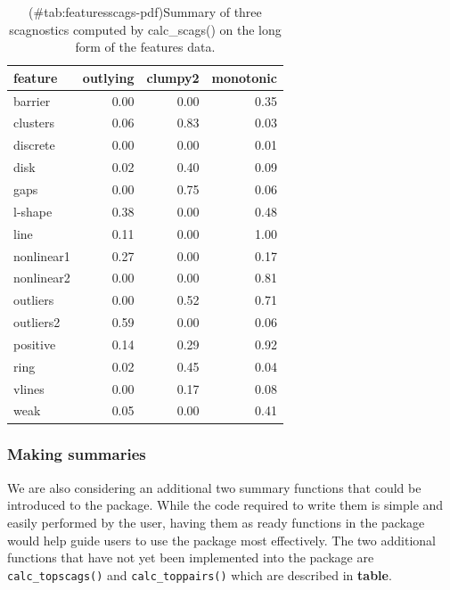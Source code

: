 \begin{Schunk}
\begin{table}

\caption{(\#tab:featuresscags-pdf)Summary of three scagnostics computed by calc\_scags() on the long form of the features data.}
\centering
\begin{tabular}[t]{>{\raggedright\arraybackslash}p{3cm}rrr}
\toprule
feature & outlying & clumpy2 & monotonic\\
\midrule
barrier & 0.00 & 0.00 & 0.35\\
clusters & 0.06 & 0.83 & 0.03\\
discrete & 0.00 & 0.00 & 0.01\\
disk & 0.02 & 0.40 & 0.09\\
gaps & 0.00 & 0.75 & 0.06\\
\addlinespace
l-shape & 0.38 & 0.00 & 0.48\\
line & 0.11 & 0.00 & 1.00\\
nonlinear1 & 0.27 & 0.00 & 0.17\\
nonlinear2 & 0.00 & 0.00 & 0.81\\
outliers & 0.00 & 0.52 & 0.71\\
\addlinespace
outliers2 & 0.59 & 0.00 & 0.06\\
positive & 0.14 & 0.29 & 0.92\\
ring & 0.02 & 0.45 & 0.04\\
vlines & 0.00 & 0.17 & 0.08\\
weak & 0.05 & 0.00 & 0.41\\
\bottomrule
\end{tabular}
\end{table}

\end{Schunk}

\hypertarget{making-summaries}{%
\subsubsection{Making summaries}\label{making-summaries}}

We are also considering an additional two summary functions that could
be introduced to the package. While the code required to write them is
simple and easily performed by the user, having them as ready functions
in the package would help guide users to use the package most
effectively. The two additional functions that have not yet been
implemented into the package are \texttt{calc\_topscags()} and
\texttt{calc\_toppairs()} which are described in \textbf{table}.

